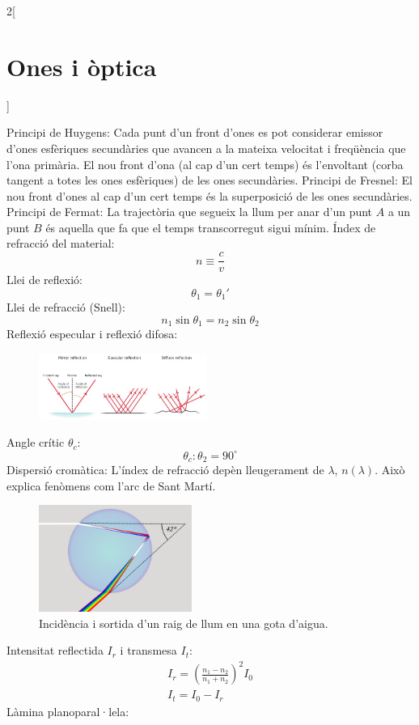\documentclass[class=article,10pt,crop=false]{standalone}
\begin{document}
\begin{multicols}{2}[\section{Ones i òptica}]
\begin{itemize}
\end{itemize}
Principi de Huygens: Cada punt d’un front d’ones es pot considerar emissor d’ones esfèriques secundàries que avancen a la mateixa velocitat i freqüència que l’ona primària. El nou front d’ona (al cap d’un cert temps) és l’envoltant (corba tangent a totes les ones esfèriques) de les ones secundàries.\newline
Principi de Fresnel: El nou front d’ones al cap d’un cert temps és la superposició de les ones secundàries.\newline
Principi de Fermat: La trajectòria que se\-gueix la llum per anar d’un punt $A$ a un punt $B$ és aquella que fa que el temps transcorregut sigui mínim.\newline
Índex de refracció del material: $$n\equiv\frac{c}{v}$$
Llei de reflexió: $$\theta_1=\theta_1'$$
Llei de refracció (Snell): $$n_1\sin\theta_1=n_2\sin\theta_2$$
Reflexió especular i reflexió difosa:\newline
\begin{figure}
    \includegraphics[width=5.5cm]{Physics/1st/Ones_i_optica/Imatges/diffuse.jpg} 
\end{figure}
Angle crític $\theta_c$: $$\theta_c:\theta_2=90^\circ$$
Dispersió cromàtica: L'índex de refracció depèn lleugerament de $\lambda$, $n(\lambda)$. Això explica fenòmens com l'arc de Sant Martí.
\begin{figure}
    \includegraphics[width=5cm]{Physics/1st/Ones_i_optica/Imatges/rainbow.jpg} 
    \caption{Incidència i sortida d'un raig de llum en una gota d'aigua.}
\end{figure}
Intensitat reflectida $I_r$ i transmesa $I_t$:
\begin{gather*}
    I_r=\left(\frac{n_1-n_2}{n_1+n_2}\right)^2I_0\\
    I_t=I_0-I_r
\end{gather*}
Làmina planoparal·lela:\newline

\end{multicols}
\end{document}
